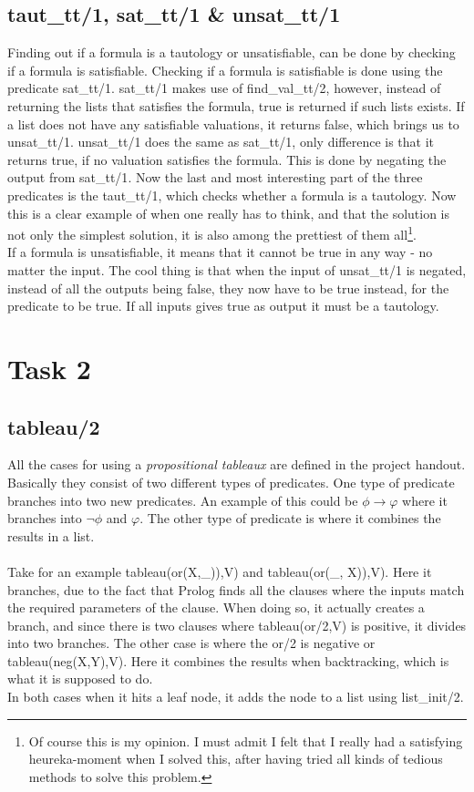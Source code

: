 \documentclass[a4paper,10pt]{article}
\begin{document}
\subsection{taut\_tt/1, sat\_tt/1 \& unsat\_tt/1}
Finding out if a formula is a tautology or unsatisfiable, can be done by checking if a formula is satisfiable. Checking if a formula is satisfiable is done using the predicate \textsf{sat\_tt/1}. \textsf{sat\_tt/1} makes use of \textsf{find\_val\_tt/2}, however, instead of returning the lists that satisfies the formula, true is returned if such lists exists. If a list does not have any satisfiable valuations, it returns false, which brings us to \textsf{unsat\_tt/1}. \textsf{unsat\_tt/1} does the same as \textsf{sat\_tt/1}, only difference is that it returns true, if no valuation satisfies the formula. This is done by negating the output from \textsf{sat\_tt/1}. Now the last and most interesting part of the three predicates is the \textsf{taut\_tt/1}, which checks whether a formula is a tautology. Now this is a clear example of when one really has to think, and that the solution is not only the simplest solution, it is also among the prettiest of them all\footnote{Of course this is my opinion. I must admit I felt that I really had a satisfying heureka-moment when I solved this, after having tried all kinds of tedious methods to solve this problem.}.\\
If a formula is unsatisfiable, it means that it cannot be true in any way - no matter the input. The cool thing is that when the input of \textsf{unsat\_tt/1} is negated, instead of all the outputs being false, they now have to be true instead, for the predicate to be true. If all inputs gives true as output it must be a tautology.
\section{Task 2}
\subsection{tableau/2}
All the cases for using a \textit{propositional tableaux} are defined in the project handout. Basically they consist of two different types of predicates. One type of predicate branches into two new predicates. An example of this could be $\phi \rightarrow \varphi$ where it branches into $\neg\phi$ and $\varphi$. The other type of predicate is where it combines the results in a list.\\\\
Take for an example \textsf{tableau(or(X,\_)),V)} and \textsf{tableau(or(\_, X)),V)}. Here it branches, due to the fact that Prolog finds all the clauses where the inputs match the required parameters of the clause. When doing so, it actually creates a branch, and since there is two clauses where \textsf{tableau(or/2,V)} is positive, it divides into two branches.
The other case is where the \textsf{or/2} is negative or \textsf{tableau(neg(X,Y),V)}. Here it combines the results when backtracking, which is what it is supposed to do.\\
In both cases when it hits a leaf node, it adds the node to a list using \textsf{list\_init/2}.
\end{document}
